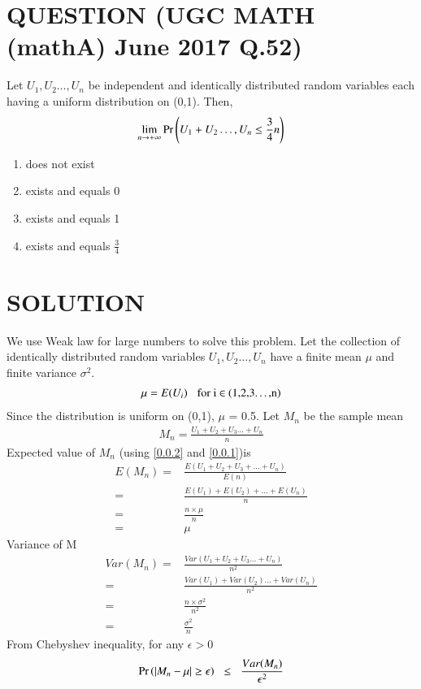 \documentclass[journal,12pt,twocolumn]{IEEEtran}
\begin{document}
\section*{QUESTION (UGC MATH (mathA) June 2017 Q.52)}
Let $U_1,U_2\dots,U_n$ be independent and identically distributed random variables each
having a uniform distribution on (0,1). Then,$$\lim_{n \to +\infty} \Pr\left(U_1+U_2\dots,U_n\leq \frac{3}{4}n\right)$$
\begin{enumerate}
    \item does not exist
    \item exists and equals 0
    \item exists and equals 1
    \item exists and equals $\frac{3}{4}$
\end{enumerate}
\section*{SOLUTION}
We use Weak law for large numbers to solve this problem. 
Let the collection of identically distributed random variables $U_1,U_2\dots,U_n$
have a finite mean $\mu$ and finite variance $\sigma^2$.
\begin{align}
    \mu = E(U_i) \hspace{0.3cm}\text{for i $\in$ (1,2,3\dots,n)}\label{0.0.1}
\end{align}
Since the distribution is uniform on (0,1), $\mu$ = 0.5. Let $M_n$ be the sample mean
\begin{align}
     M_n = \frac{U_1+U_2+U_3\dots+U_n}{n}\label{0.0.2}
\end{align}
Expected value of $M_n$ (using \eqref{0.0.2} and \eqref{0.0.1})is
\begin{align}
    E(M_n) = &\frac{E(U_1+U_2+U_3+\dots+U_n)}{E(n)}\\[0.3cm]
     = &\frac{E(U_1)+E(U_2)+\dots+E(U_n)}{n}\\
     = &\frac{n\times\mu}{n}\\
     = & \mu
\end{align}
Variance of M
\begin{align}
    Var(M_n) =& \frac{Var(U_1+U_2+U_3\dots+U_n)}{n^2}\\[0.3cm]
    =& \frac{Var(U_1) + Var(U_2)\dots+Var(U_n)}{n^2}\\
    =& \frac{n\times{\sigma^2}}{n^2}\\[0.3cm]
    =& \frac{\sigma^2}{n} \label{0.0.10}
\end{align}
From Chebyshev inequality, for any $\epsilon > 0$
\begin{align}
    \Pr\left(|M_n-\mu|\geq \epsilon\right) \hspace{0.2cm} \leq \hspace{0.2cm} \frac{Var(M_n)}{\epsilon^2}
\end{align}
\end{document}
